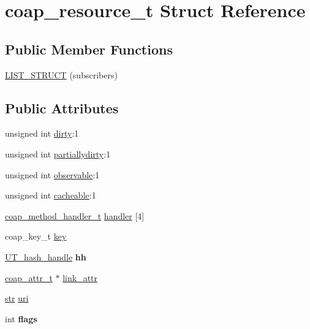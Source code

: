 \hypertarget{structcoap__resource__t}{}\section{coap\+\_\+resource\+\_\+t Struct Reference}
\label{structcoap__resource__t}
\subsection*{Public Member Functions}
\begin{DoxyCompactItemize}
\item 
\hyperlink{structcoap__resource__t_a7320c5df49bb1fd5dd4c2ea6dba6bd9d}{L\+I\+S\+T\+\_\+\+S\+T\+R\+U\+C\+T} (subscribers)
\end{DoxyCompactItemize}
\subsection*{Public Attributes}
\begin{DoxyCompactItemize}
\item 
unsigned int \hyperlink{structcoap__resource__t_a09b8f3b601ad2e2e48f8ebb47a2f3bef}{dirty}\+:1
\item 
unsigned int \hyperlink{structcoap__resource__t_a1574825943641eaf8fd4229bcbb818c8}{partiallydirty}\+:1
\item 
unsigned int \hyperlink{structcoap__resource__t_ac398cbf0112b945e22176dbbf9790a87}{observable}\+:1
\item 
unsigned int \hyperlink{structcoap__resource__t_a608274b876671be27e2bd099fa112f75}{cacheable}\+:1
\item 
\hyperlink{resource_8h_ad2b83945efbc3230d64f81d0e966df56}{coap\+\_\+method\+\_\+handler\+\_\+t} \hyperlink{structcoap__resource__t_afcc8ff3f429a9e69e254665c42ac1e41}{handler} \mbox{[}4\mbox{]}
\item 
coap\+\_\+key\+\_\+t \hyperlink{structcoap__resource__t_ad055df551d64acc0806b1df89d727d75}{key}
\item 
\hypertarget{structcoap__resource__t_af63bf8fad6bf44a77599a57456bd919c}{}\hyperlink{structUT__hash__handle}{U\+T\+\_\+hash\+\_\+handle} {\bfseries hh}\label{structcoap__resource__t_af63bf8fad6bf44a77599a57456bd919c}

\item 
\hyperlink{structcoap__attr__t}{coap\+\_\+attr\+\_\+t} $\ast$ \hyperlink{structcoap__resource__t_a9359a93af7804828408cd7638bb2325a}{link\+\_\+attr}
\item 
\hyperlink{structstr}{str} \hyperlink{structcoap__resource__t_aa250947f8ad4cf5e4ebe60ea305c4607}{uri}
\item 
\hypertarget{structcoap__resource__t_aea7b315210c6674d4079fa2e0e45ebec}{}int {\bfseries flags}\label{structcoap__resource__t_aea7b315210c6674d4079fa2e0e45ebec}

\end{DoxyCompactItemize}


